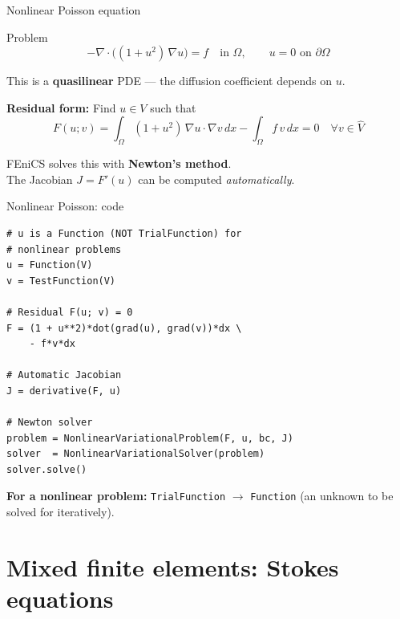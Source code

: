 \documentclass[aspectratio=169, 11pt]{beamer}
\begin{document}
\begin{frame}{Nonlinear Poisson equation}

\begin{block}{Problem}
\[
  -\nabla \cdot \bigl( (1 + u^2)\, \nabla u \bigr) = f \quad \text{in } \Omega,
  \qquad u = 0 \text{ on } \partial\Omega
\]
\end{block}

\medskip

This is a \textbf{quasilinear} PDE --- the diffusion coefficient depends on $u$.

\medskip

\textbf{Residual form:} Find $u \in V$ such that
\[
  F(u; v) = \int_\Omega (1 + u^2)\, \nabla u \cdot \nabla v \, dx
           - \int_\Omega f \, v \, dx = 0
  \quad \forall v \in \hat{V}
\]

\medskip
FEniCS solves this with \textbf{Newton's method}.\\
The Jacobian $J = F'(u)$ can be computed \emph{automatically}.

\end{frame}

\begin{frame}[fragile]{Nonlinear Poisson: code}

\begin{lstlisting}
# u is a Function (NOT TrialFunction) for
# nonlinear problems
u = Function(V)
v = TestFunction(V)

# Residual F(u; v) = 0
F = (1 + u**2)*dot(grad(u), grad(v))*dx \
    - f*v*dx

# Automatic Jacobian
J = derivative(F, u)

# Newton solver
problem = NonlinearVariationalProblem(F, u, bc, J)
solver  = NonlinearVariationalSolver(problem)
solver.solve()
\end{lstlisting}

\bigskip
\small
\textbf{For a nonlinear problem:}
\texttt{TrialFunction} $\to$ \texttt{Function} (an unknown to be solved for iteratively).

\end{frame}

\section{Mixed finite elements: Stokes equations}
\end{document}
